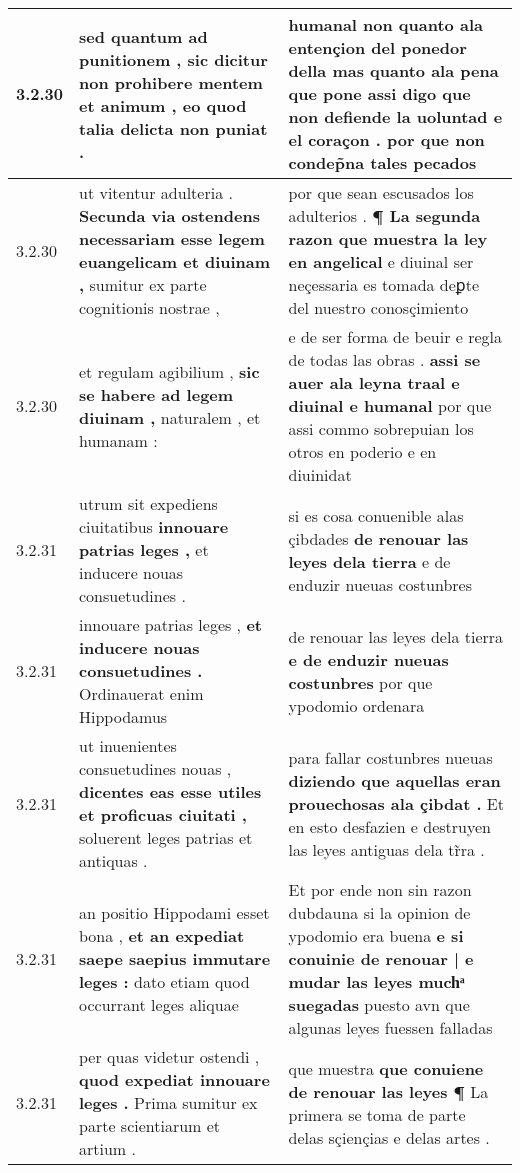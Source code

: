 \begin{tabular}{|p{1cm}|p{6.5cm}|p{6.5cm}|}
3.2.30 & sed quantum ad punitionem , \textbf{ sic dicitur non prohibere mentem et animum , } eo quod talia delicta non puniat . & humanal non quanto ala entençion del ponedor della \textbf{ mas quanto ala pena que pone assi digo que non defiende la uoluntad e el coraçon . } por que non condep̃na tales pecados \\\hline
3.2.30 & ut vitentur adulteria . \textbf{ Secunda via ostendens necessariam esse legem euangelicam et diuinam , } sumitur ex parte cognitionis nostrae , & por que sean escusados los adulterios . \textbf{ ¶ La segunda razon que muestra la ley en angelical } e diuinal ser neçessaria es tomada deꝑte del nuestro conosçimiento \\\hline
3.2.30 & et regulam agibilium , \textbf{ sic se habere ad legem diuinam , } naturalem , et humanam : & e de ser forma de beuir e regla de todas las obras . \textbf{ assi se auer ala leyna traal e diuinal e humanal } por que assi commo sobrepuian los otros en poderio e en diuinidat \\\hline
3.2.31 & utrum sit expediens ciuitatibus \textbf{ innouare patrias leges , } et inducere nouas consuetudines . & si es cosa conuenible alas çibdades \textbf{ de renouar las leyes dela tierra } e de enduzir nueuas costunbres \\\hline
3.2.31 & innouare patrias leges , \textbf{ et inducere nouas consuetudines . } Ordinauerat enim Hippodamus & de renouar las leyes dela tierra \textbf{ e de enduzir nueuas costunbres } por que ypodomio ordenara \\\hline
3.2.31 & ut inuenientes consuetudines nouas , \textbf{ dicentes eas esse utiles et proficuas ciuitati , } soluerent leges patrias et antiquas . & para fallar costunbres nueuas \textbf{ diziendo que aquellas eran prouechosas ala çibdat . } Et en esto desfazien e destruyen las leyes antiguas dela tr̃ra . \\\hline
3.2.31 & an positio Hippodami esset bona , \textbf{ et an expediat saepe saepius immutare leges : } dato etiam quod occurrant leges aliquae & Et por ende non sin razon dubdauna si la opinion de ypodomio era buena \textbf{ e si conuinie de renouar | e mudar las leyes muchͣ suegadas } puesto avn que algunas leyes fuessen falladas \\\hline
3.2.31 & per quas videtur ostendi , \textbf{ quod expediat innouare leges . } Prima sumitur ex parte scientiarum et artium . & que muestra \textbf{ que conuiene de renouar las leyes ¶ } La primera se toma de parte delas sçiençias e delas artes . \\\hline

\end{tabular}
